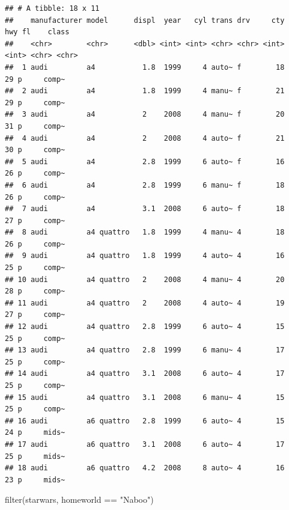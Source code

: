 \documentclass[]{tufte-handout}
\newenvironment{Shaded}{}{}
\newcommand{\FunctionTok}[1]{\textcolor[rgb]{0.02,0.16,0.49}{#1}}
\newcommand{\NormalTok}[1]{#1}
\newcommand{\SpecialCharTok}[1]{\textcolor[rgb]{0.25,0.44,0.63}{#1}}
\newcommand{\StringTok}[1]{\textcolor[rgb]{0.25,0.44,0.63}{#1}}
\begin{document}
\begin{verbatim}
## # A tibble: 18 x 11
##    manufacturer model      displ  year   cyl trans drv     cty   hwy fl    class
##    <chr>        <chr>      <dbl> <int> <int> <chr> <chr> <int> <int> <chr> <chr>
##  1 audi         a4           1.8  1999     4 auto~ f        18    29 p     comp~
##  2 audi         a4           1.8  1999     4 manu~ f        21    29 p     comp~
##  3 audi         a4           2    2008     4 manu~ f        20    31 p     comp~
##  4 audi         a4           2    2008     4 auto~ f        21    30 p     comp~
##  5 audi         a4           2.8  1999     6 auto~ f        16    26 p     comp~
##  6 audi         a4           2.8  1999     6 manu~ f        18    26 p     comp~
##  7 audi         a4           3.1  2008     6 auto~ f        18    27 p     comp~
##  8 audi         a4 quattro   1.8  1999     4 manu~ 4        18    26 p     comp~
##  9 audi         a4 quattro   1.8  1999     4 auto~ 4        16    25 p     comp~
## 10 audi         a4 quattro   2    2008     4 manu~ 4        20    28 p     comp~
## 11 audi         a4 quattro   2    2008     4 auto~ 4        19    27 p     comp~
## 12 audi         a4 quattro   2.8  1999     6 auto~ 4        15    25 p     comp~
## 13 audi         a4 quattro   2.8  1999     6 manu~ 4        17    25 p     comp~
## 14 audi         a4 quattro   3.1  2008     6 auto~ 4        17    25 p     comp~
## 15 audi         a4 quattro   3.1  2008     6 manu~ 4        15    25 p     comp~
## 16 audi         a6 quattro   2.8  1999     6 auto~ 4        15    24 p     mids~
## 17 audi         a6 quattro   3.1  2008     6 auto~ 4        17    25 p     mids~
## 18 audi         a6 quattro   4.2  2008     8 auto~ 4        16    23 p     mids~
\end{verbatim}

\begin{Shaded}
\begin{Highlighting}[]
\FunctionTok{filter}\NormalTok{(starwars, homeworld }\SpecialCharTok{==} \StringTok{"Naboo"}\NormalTok{)}
\end{Highlighting}
\end{Shaded}
\end{document}
